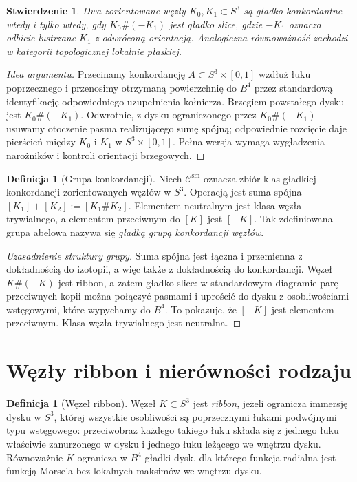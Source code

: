 \documentclass[11pt,a4paper]{report}
\numberwithin{equation}{section}
\theoremstyle{plain}
\newtheorem{stwierdzenie}[twierdzenie]{Stwierdzenie}
\theoremstyle{definition}
\newtheorem{definicja}[twierdzenie]{Definicja}
\theoremstyle{remark}
\begin{document}
\begin{stwierdzenie}
Dwa zorientowane węzły $K_0,K_1\subset S^3$ są gładko
konkordantne wtedy i tylko wtedy, gdy
$K_0\#(-K_1)$ jest gładko slice, gdzie $-K_1$
oznacza odbicie lustrzane $K_1$ z odwróconą orientacją.
Analogiczna równoważność zachodzi w kategorii topologicznej
lokalnie płaskiej.
\end{stwierdzenie}

\begin{proof}[Idea argumentu]
Przecinamy konkordancję $A\subset S^3\times[0,1]$
wzdłuż łuku poprzecznego i przenosimy otrzymaną powierzchnię
do $B^4$ przez standardową identyfikację odpowiedniego
uzupełnienia kołnierza. Brzegiem powstałego dysku jest
$K_0\#(-K_1)$. Odwrotnie, z dysku ograniczonego przez
$K_0\#(-K_1)$ usuwamy otoczenie pasma realizującego sumę
spójną; odpowiednie rozcięcie daje pierścień między
$K_0$ i $K_1$ w $S^3\times[0,1]$.
Pełna wersja wymaga wygładzenia narożników i kontroli
orientacji brzegowych.
\end{proof}

\begin{definicja}[Grupa konkordancji]
Niech $\mathcal C^{\mathrm{sm}}$ oznacza zbiór klas gładkiej
konkordancji zorientowanych węzłów w $S^3$.
Operacją jest suma spójna $[K_1]+[K_2]:=[K_1\#K_2]$.
Elementem neutralnym jest klasa węzła trywialnego,
a elementem przeciwnym do $[K]$ jest $[-K]$.
Tak zdefiniowana grupa abelowa nazywa się
\emph{gładką grupą konkordancji węzłów}.
\end{definicja}

\begin{proof}[Uzasadnienie struktury grupy]
Suma spójna jest łączna i przemienna z dokładnością
do izotopii, a więc także z dokładnością do konkordancji.
Węzeł $K\#(-K)$ jest ribbon, a zatem gładko slice:
w standardowym diagramie parę przeciwnych kopii można
połączyć pasmami i uprościć do dysku z osobliwościami
wstęgowymi, które wypychamy do $B^4$. To pokazuje, że
$[-K]$ jest elementem przeciwnym. Klasa węzła trywialnego
jest neutralna.
\end{proof}

\section{Węzły ribbon i nierówności rodzaju}
\label{sec:kt-ribbon}

\begin{definicja}[Węzeł ribbon]
Węzeł $K\subset S^3$ jest \emph{ribbon}, jeżeli ogranicza
immersję dysku w $S^3$, której wszystkie osobliwości
są poprzecznymi łukami podwójnymi typu wstęgowego:
przeciwobraz każdego takiego łuku składa się z jednego
łuku właściwie zanurzonego w dysku i jednego łuku leżącego
we wnętrzu dysku. Równoważnie $K$ ogranicza w $B^4$
gładki dysk, dla którego funkcja radialna jest funkcją
Morse'a bez lokalnych maksimów we wnętrzu dysku.
\end{definicja}
\end{document}
